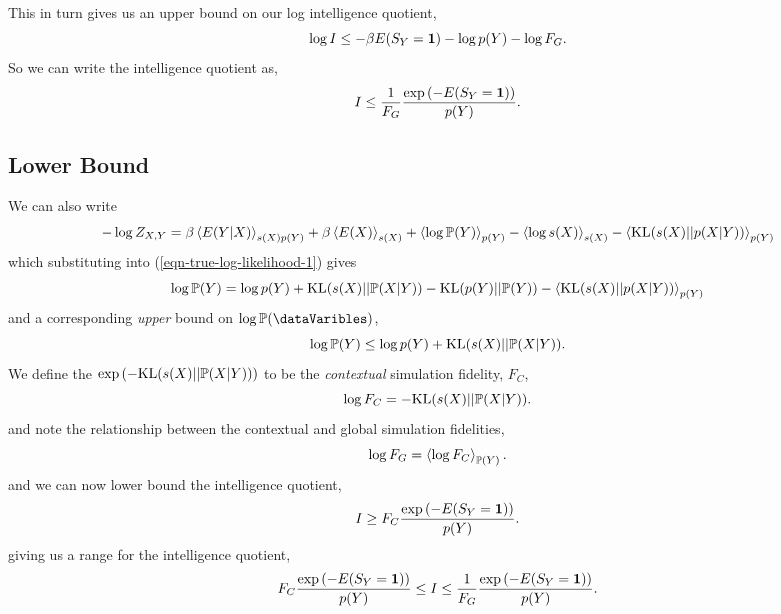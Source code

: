 \documentclass[]{article}
\begin{document}
This in turn gives us an upper bound on our log intelligence quotient,
\[
\log I \leq -\beta E(S_Y = \textbf{1}) -\log p(Y) - \log F_G.
\]
So we can write the intelligence quotient as,
\[
I \leq \frac{1}{F_G}\frac{\exp\left(-E(S_Y=\textbf{1})\right)}{p(Y)}.
\]

\subsection{Lower Bound}

We can also write 
\[
-  \log Z_{X,Y} = \beta\left\langle E(Y | X) \right\rangle_{s(X)p(Y)} + \beta\left\langle E(X) \right\rangle_{s(X )} + \left\langle \log \mathbb{P}(Y) \right\rangle_{p(Y)} -\left\langle \log s(X) \right\rangle_{s(X)} - \left\langle \text{KL}(s(X) || p(X | Y)) \right\rangle_{p(Y)}
\]
which substituting into (\ref{eqn-true-log-likelihood-1}) gives
\[
\log \mathbb{P}(Y) = \log p(Y) +  \text{KL}(s(X)||\mathbb{P}(X|Y)) - \text{KL}(p(Y) || \mathbb{P}(Y)) - \left\langle \text{KL}(s(X) || p(X | Y)) \right\rangle_{p(Y)}
\]
and a corresponding \emph{upper} bound on $\log \trueProb(\dataVaribles)$, 
\[
\log \mathbb{P}(Y) \leq \log p(Y) +   \text{KL}(s(X)||\mathbb{P}(X|Y)).
\]
We define the $\exp\left(- \text{KL}(s(X)||\mathbb{P}(X|Y))\right)$ to be the \emph{contextual} simulation fidelity, $F_C$,
\[
\log F_C = -\text{KL}(s(X)||\mathbb{P}(X|Y)).
\]
and note the relationship between the contextual and global simulation fidelities,
\[
\log F_G = \left\langle \log F_C \right\rangle_{\mathbb{P}(Y)}.
\]
and we can now lower bound the intelligence quotient,
\[
I \geq F_C \frac{\exp\left(-E(S_Y= \textbf{1})\right)}{p(Y)}.
\]
giving us a range for the intelligence quotient,
\[
F_C \frac{\exp\left(-E(S_Y= \textbf{1})\right)}{p(Y)} \leq I \leq \frac{1}{F_G}\frac{\exp\left(-E(S_Y= \textbf{1})\right)}{p(Y)}.
\]
\end{document}
